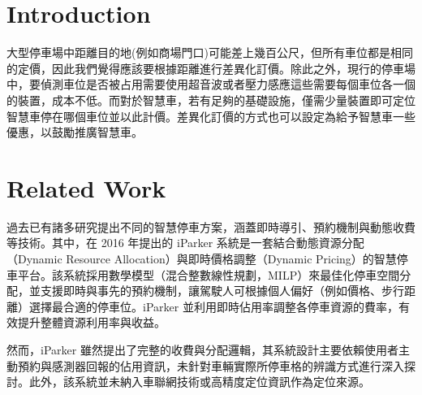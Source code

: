 \documentclass[sigconf,authorversion,nonacm,screen]{acmart}
\begin{document}



\maketitle

\section{Introduction}

\quad 大型停車場中距離目的地(例如商場門口)可能差上幾百公尺，但所有車位都是相同的定價，因此我們覺得應該要根據距離進行差異化訂價。除此之外，現行的停車場中，要偵測車位是否被占用需要使用超音波或者壓力感應這些需要每個車位各一個的裝置，成本不低。而對於智慧車，若有足夠的基礎設施，僅需少量裝置即可定位智慧車停在哪個車位並以此計價。差異化訂價的方式也可以設定為給予智慧車一些優惠，以鼓勵推廣智慧車。






\section{Related Work}

\quad 過去已有諸多研究提出不同的智慧停車方案，涵蓋即時導引、預約機制與動態收費等技術。其中，\citet{kotb2016iparker}在 2016 年提出的 iParker 系統是一套結合動態資源分配（Dynamic Resource Allocation）與即時價格調整（Dynamic Pricing）的智慧停車平台。該系統採用數學模型（混合整數線性規劃，MILP）來最佳化停車空間分配，並支援即時與事先的預約機制，讓駕駛人可根據個人偏好（例如價格、步行距離）選擇最合適的停車位。iParker 並利用即時佔用率調整各停車資源的費率，有效提升整體資源利用率與收益。

然而，iParker 雖然提出了完整的收費與分配邏輯，其系統設計主要依賴使用者主動預約與感測器回報的佔用資訊，未針對車輛實際所停車格的辨識方式進行深入探討。此外，該系統並未納入車聯網技術或高精度定位資訊作為定位來源。
\end{document}
